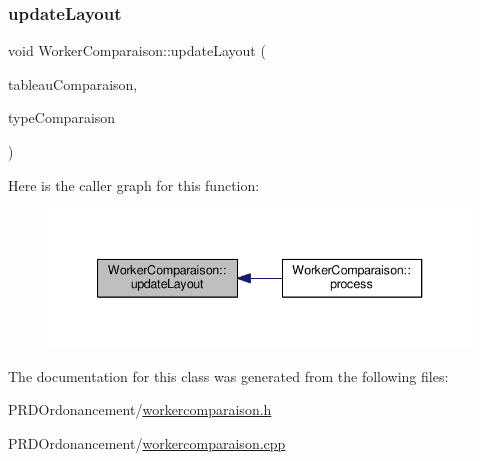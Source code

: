 \subsubsection{\texorpdfstring{update\+Layout}{updateLayout}}
{\footnotesize\ttfamily void Worker\+Comparaison\+::update\+Layout (\begin{DoxyParamCaption}\item[{map$<$ unsigned int, map$<$ Q\+String, unsigned int $>$$>$}]{tableau\+Comparaison,  }\item[{Q\+String}]{type\+Comparaison }\end{DoxyParamCaption})\hspace{0.3cm}{\ttfamily [signal]}}

Here is the caller graph for this function\+:\nopagebreak
\begin{figure}[H]
\begin{center}
\leavevmode
\includegraphics[width=340pt]{classWorkerComparaison_afc5278dea0a1d826ece10555812266bd_icgraph}
\end{center}
\end{figure}


The documentation for this class was generated from the following files\+:\begin{DoxyCompactItemize}
\item 
P\+R\+D\+Ordonancement/\hyperlink{workercomparaison_8h}{workercomparaison.\+h}\item 
P\+R\+D\+Ordonancement/\hyperlink{workercomparaison_8cpp}{workercomparaison.\+cpp}\end{DoxyCompactItemize}
